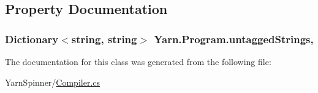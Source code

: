 \subsection{Property Documentation}
\hypertarget{a00124_aa8fedbfceaf931d1da3f600eaab6ae87}{
\subsubsection[{untagged\-Strings}]{\setlength{\rightskip}{0pt plus 5cm}Dictionary$<$string, string$>$ Yarn.\-Program.\-untagged\-Strings\hspace{0.3cm}{\ttfamily [get]}, {\ttfamily [package]}}}\label{a00124_aa8fedbfceaf931d1da3f600eaab6ae87}


The documentation for this class was generated from the following file\-:\begin{DoxyCompactItemize}
\item 
Yarn\-Spinner/\hyperlink{a00261}{Compiler.\-cs}\end{DoxyCompactItemize}
